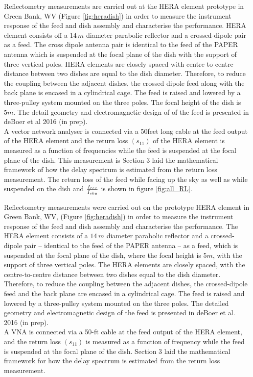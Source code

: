 \documentclass[twocolumn]{emulateapj}
\begin{document}
Reflectometry measurements are carried out at the HERA element prototype in Green
Bank, WV (Figure \ref{fig:heradish}) in order to measure the instrument response of the feed and dish assembly and characterise the performance.  HERA element consists off a $14\,m$ diameter
parabolic reflector and a crossed-dipole pair as a feed. The cross dipole antenna pair is identical to the feed of the PAPER antenna which is suspended at the focal plane of the dish with the support of three vertical poles. HERA elements are closely spaced with centre to centre distance between two dishes are equal to the dish diameter. Therefore, to reduce the coupling between the adjacent dishes, the crossed dipole feed along with the back plane is encased in a cylindrical cage. The feed is raised and
lowered by a three-pulley system mounted on the three poles. The focal height of the dish is $5m$.  The detail geometry and electromagnetic design of of the feed is presented in deBoer et al 2016 (in prep). \\
A vector network analyser is connected via a 50feet long cable at the feed output of the HERA element and the return loss $(s_{11})$ of the HERA element is measured as a function of frequencies while the feed is suspended at the focal plane of the dish. This measurement is 
Section 3 laid the mathematical framework of how the delay spectrum is estimated from the return loss measurement. The return loss of the feed while  facing up the sky as well as while suspended on the dish and ${I_{rec}\over I_{sky}}$  is shown in figure \ref{fig:all_RL}.

Reflectometry measurements were carried out on the prototype HERA element in Green
Bank, WV, (Figure \ref{fig:heradish}) in order to measure the instrument response of the feed and dish assembly and characterise the performance. The HERA element consists of a $14\,m$ diameter
parabolic reflector and a crossed-dipole pair -- identical to the feed of the PAPER antenna -- as a feed, which is suspended at the focal plane of the dish, where the focal height is $5m$, with the support of three vertical poles. The HERA elements are closely spaced, with the centre-to-centre distance between two dishes equal to the dish diameter. Therefore, to reduce the coupling between the adjacent dishes, the crossed-dipole feed and the back plane are encased in a cylindrical cage. The feed is raised and lowered by a three-pulley system mounted on the three poles. The detailed geometry and electromagnetic design of the feed is presented in deBoer et al. 2016 (in prep). \\
\indent A VNA is connected via a 50-ft cable at the feed output of the HERA element, and the return loss $(s_{11})$ is measured as a function of frequency while the feed is suspended at the focal plane of the dish. Section 3 laid the mathematical framework for how the delay spectrum is estimated from the return loss measurement. 
\end{document}
